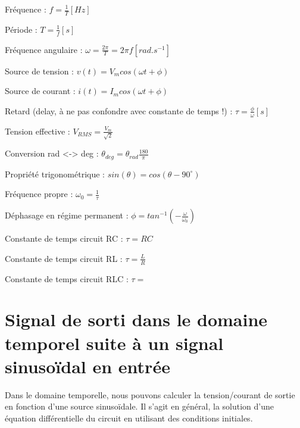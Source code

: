\documentclass[11pt]{report}
\begin{document}
\begin{framed}
   Fréquence : $f = \frac{1}{T} \left[ Hz \right]$ \newline

   Période : $T= \frac{1}{f} \left[ s \right]$ \newline

   Fréquence angulaire : $\omega = \frac{2\pi}{T} = 2\pi f \left[ rad.s^{-1} \right]$ \newline

   Source de tension : $v(t) = V_mcos(\omega t + \phi)$ \newline

   Source de courant : $i(t) = I_mcos(\omega t + \phi)$ \newline

   Retard (delay, à ne pas confondre avec constante de temps !) : $\tau = \frac{\phi}{\omega} \left[ s \right]$ \newline

   Tension effective : $V_{RMS} = \frac{V_m}{\sqrt{2}}$ \newline

   Conversion rad <-> deg : $\theta_{deg} = \theta_{rad}\frac{180}{\pi}$ \newline

   Propriété trigonométrique : $sin(\theta) = cos(\theta - 90^{\circ})$\newline

   Fréquence propre : $\omega_0 = \frac{1}{\tau}$\newline

   Déphasage en régime permanent : $\phi = tan^{-1}(-\frac{\omega}{\omega_0})$ \newline

   Constante de temps circuit RC : $\tau = RC$  \newline

   Constante de temps circuit RL : $\tau = \frac{L}{R}$ \newline

   Constante de temps circuit RLC : $\tau = $ \newline


\end{framed}
\newpage

\section{Signal de sorti dans le domaine temporel suite à un signal sinusoïdal en entrée}
Dans le domaine temporelle, nous pouvons calculer la tension/courant de sortie en fonction d'une source sinusoïdale. Il s'agit en général, la solution d'une équation différentielle du circuit en utilisant des conditions initiales.
\end{document}
